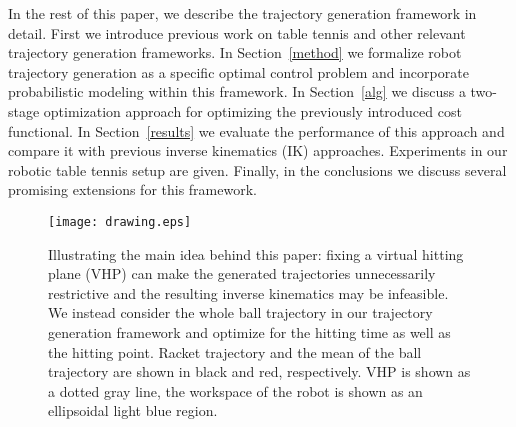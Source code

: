 In the rest of this paper, we describe the trajectory generation framework in detail. First we introduce previous work on table tennis and other relevant trajectory generation frameworks. In Section~\ref{method} we formalize robot trajectory generation as a specific optimal control problem and incorporate probabilistic modeling within this framework. In Section~\ref{alg} we discuss a two-stage optimization approach for optimizing the previously introduced cost functional. In Section~\ref{results} we evaluate the performance of this approach and compare it with previous inverse kinematics (IK) approaches. Experiments in our robotic table tennis setup are given. Finally, in the conclusions we discuss several promising extensions for this framework. %

\begin{figure}[t!]
\centering
\texttt{[image: drawing.eps]}			
\caption{Illustrating the main idea behind this paper: fixing a virtual hitting plane (VHP) can make the generated trajectories unnecessarily restrictive and the resulting inverse kinematics may be infeasible. We instead consider the whole ball trajectory in our trajectory generation framework and optimize for the hitting time as well as the hitting point. Racket trajectory and the mean of the ball trajectory are shown in black and red, respectively. VHP is shown as a dotted gray line, the workspace of the robot is shown as an ellipsoidal light blue region.}
\label{mainIdea}
\end{figure}